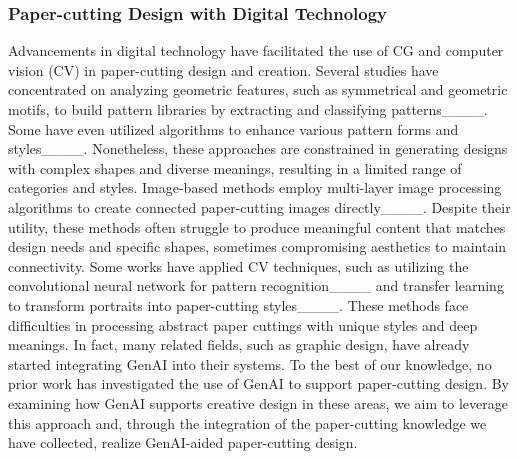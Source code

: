 \subsubsection{Paper-cutting Design with Digital Technology }
Advancements in digital technology have facilitated the use of CG and computer vision (CV) in paper-cutting design and creation. Several studies have concentrated on analyzing geometric features, such as symmetrical and geometric motifs, to build pattern libraries by extracting and classifying patterns____. Some have even utilized algorithms to enhance various pattern forms and styles____. Nonetheless, these approaches are constrained in generating designs with complex shapes and diverse meanings, resulting in a limited range of categories and styles.
Image-based methods employ multi-layer image processing algorithms to create connected paper-cutting images directly____. Despite their utility, these methods often struggle to produce meaningful content that matches design needs and specific shapes, sometimes compromising aesthetics to maintain connectivity.
Some works have applied CV techniques, such as utilizing the convolutional neural network for pattern recognition____ and transfer learning to transform portraits into paper-cutting styles____. These methods face difficulties in processing abstract paper cuttings with unique styles and deep meanings. In fact, many related fields, such as graphic design, have already started integrating GenAI into their systems. To the best of our knowledge, no prior work has investigated the use of GenAI to support paper-cutting design. By examining how GenAI supports creative design in these areas, we aim to leverage this approach and, through the integration of the paper-cutting knowledge we have collected, realize GenAI-aided paper-cutting design.

